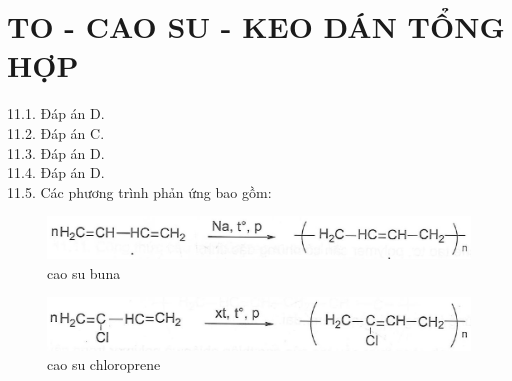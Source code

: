 \documentclass[10pt]{article}
\begin{document}
\section*{TO - CAO SU - KEO DÁN TỔNG HỢP}
11.1. Đáp án D.\\
11.2. Đáp án C.\\
11.3. Đáp án D.\\
11.4. Đáp án D.\\
11.5. Các phương trình phản ứng bao gồm:

\begin{figure}[h]
\begin{center}
  \includegraphics[width=\textwidth]{2025_10_23_b4e16b74380d0f7e7700g-068(3)}
\captionsetup{labelformat=empty}
\caption{cao su buna}
\end{center}
\end{figure}

\begin{figure}[h]
\begin{center}
  \includegraphics[width=\textwidth]{2025_10_23_b4e16b74380d0f7e7700g-068(2)}
\captionsetup{labelformat=empty}
\caption{cao su chloroprene}
\end{center}
\end{figure}
\end{document}
